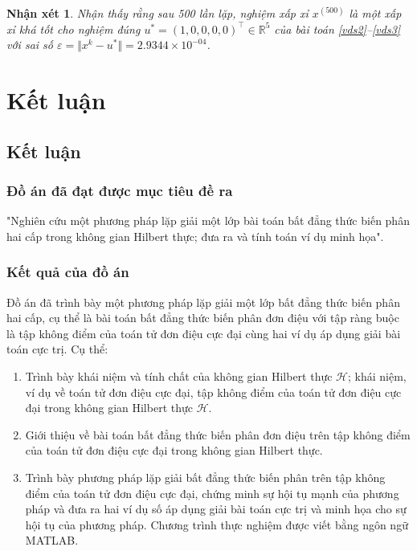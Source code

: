 \documentclass[14pt, oneside,A4paper]{book}
\theoremstyle{plain}
\newtheorem{nx}[theorem]{\bf Nhận xét}
\begin{document}
\begin{nx} \rm Nhận thấy rằng sau 500 lần lặp, nghiệm xấp xỉ $x^{(500)}$ là một xấp xỉ khá tốt cho nghiệm đúng $u^{*}=(1,0,0,0,0)^\top \in \mathbb R^5$ của bài toán \eqref{vds2}--\eqref{vds3} với sai số $\varepsilon =\Vert x^k-u^*\Vert = 2.9344 \times 10^{-04}$. 
\end{nx}

\chapter{Kết luận}                         %
\section{Kết luận}

\subsection*{Đồ án đã đạt được mục tiêu đề ra} 

"Nghiên cứu một phương pháp lặp giải một lớp bài toán bất đẳng thức biến phân hai cấp trong không gian Hilbert thực; đưa ra  và tính toán ví dụ minh họa".

\subsection*{Kết quả của đồ án} 

Đồ án đã trình bày một phương pháp lặp giải một lớp bất đẳng thức biến phân hai cấp, cụ thể là bài toán bất đẳng thức biến phân đơn điệu với tập ràng buộc là tập không điểm của toán tử đơn điệu cực đại cùng hai ví dụ áp dụng giải bài toán cực trị. Cụ thể:
\begin{enumerate}
	\item Trình bày khái niệm và tính chất của không gian Hilbert thực $\mathcal H$; khái niệm, ví dụ về toán tử đơn điệu cực đại, tập không điểm của toán tử đơn điệu cực đại trong không gian Hilbert thực $\mathcal H$.
	\item Giới thiệu về bài toán bất đẳng thức biến phân đơn điệu trên tập không điểm của toán tử đơn điệu cực đại trong không gian Hilbert thực.
	\item Trình bày phương pháp lặp giải bất đẳng thức biến phân trên tập không điểm của toán tử đơn điệu cực đại, chứng minh sự hội tụ mạnh của phương pháp và đưa ra hai ví dụ số áp dụng giải bài toán cực trị và minh họa cho sự hội tụ của phương pháp.  Chương trình thực nghiệm được viết bằng ngôn ngữ MATLAB.
\end{enumerate}
\end{document}
